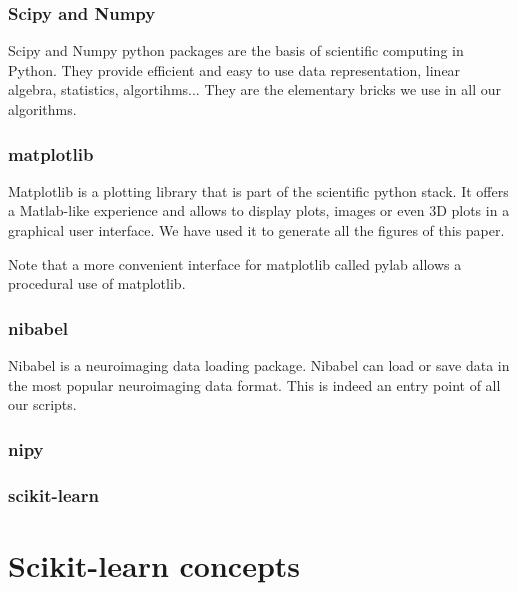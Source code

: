 \documentclass{frontiersSCNS} %
\begin{document}
\subsubsection{Scipy and Numpy}

Scipy and Numpy python packages are the basis of scientific computing in Python.
They provide efficient and easy to use data representation, linear algebra, statistics, algortihms... They are the elementary bricks we use in
all our algorithms.

\subsubsection{matplotlib}

Matplotlib is a plotting library that is part of the scientific python stack. It
offers a Matlab-like experience and allows to display plots, images or even 3D
plots in a graphical user interface. We have used it to generate all the figures
of this paper.

Note that a more convenient interface for matplotlib called pylab allows a
procedural use of matplotlib.

\subsubsection{nibabel}

Nibabel is a neuroimaging data loading package. Nibabel can load or save data in
the most popular neuroimaging data format. This is indeed an entry point of all
our scripts.

\subsubsection{nipy}


\subsubsection{scikit-learn}




\section{Scikit-learn concepts}

\end{document}
